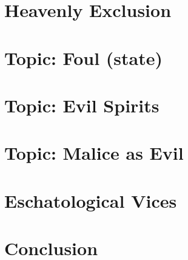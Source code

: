 \documentclass[a4paper,twocolumn,twoside,notitlepage,10pt]{article}
\begin{document}
\section{Heavenly Exclusion}
\section{Topic: Foul (state)}
\section{Topic: Evil Spirits}
\section{Topic: Malice as Evil}
\section{Eschatological Vices}



\section{Conclusion}
\end{document}
